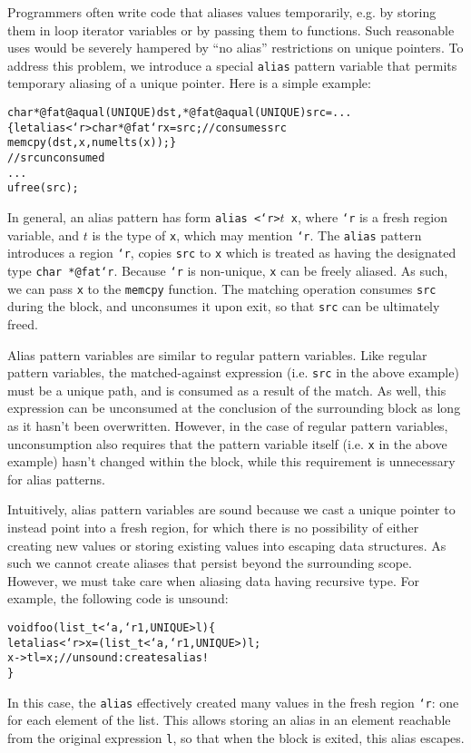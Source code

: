 Programmers often write code that aliases values temporarily, e.g. by
storing them in loop iterator variables or by passing them to functions.
Such reasonable uses would be severely hampered by ``no alias'' restrictions
on unique pointers.  To address this problem, we introduce a special
\texttt{alias} pattern variable that permits temporary aliasing of a unique
pointer.  Here is a simple example:
\begin{alltt}
  char *@fat@aqual(UNIQUE) dst, *@fat@aqual(UNIQUE) src = ...
  \{ let alias <`r>char *@fat`r x = src; // consumes src
    memcpy(dst,x,numelts(x)); \}
  // src unconsumed
  ...
  ufree(src);
\end{alltt}
In general, an alias pattern has form \texttt{alias <`r>$t$ x}, where
\texttt{`r} is a fresh region variable, and $t$ is the type of \texttt{x},
which may mention \texttt{`r}.  The \texttt{alias} pattern introduces a
region \texttt{`r}, copies \texttt{src} to \texttt{x} which is treated as
having the designated type \texttt{char *@fat`r}.  Because \texttt{`r} is
non-unique, \texttt{x} can be freely aliased.  As such, we can pass
\texttt{x} to the \texttt{memcpy} function.  The matching operation consumes
\texttt{src} during the block, and unconsumes it upon exit, so that
\texttt{src} can be ultimately freed.

Alias pattern variables are similar to regular pattern variables.  Like
regular pattern variables, the matched-against expression (i.e. \texttt{src}
in the above example) must be a unique path, and is consumed as a result of
the match.  As well, this expression can be unconsumed at the conclusion of
the surrounding block as long as it hasn't been overwritten.  However, in
the case of regular pattern variables, unconsumption also requires that the
pattern variable itself (i.e. \texttt{x} in the above example) hasn't
changed within the block, while this requirement is unnecessary for alias
patterns.

Intuitively, alias pattern variables are sound because we cast a unique
pointer to instead point into a fresh region, for which there is no
possibility of either creating new values or storing existing values into
escaping data structures.  As such we cannot create aliases that persist
beyond the surrounding scope.  However, we must take care when aliasing data
having recursive type.  For example, the following code is unsound:
\begin{alltt}
  void foo(list\_t<`a, `r1, UNIQUE> l) \{
    let alias <`r> x = (list\_t<`a, `r1, UNIQUE>)l;
    x->tl = x; // unsound: creates alias!
  \}
\end{alltt}
In this case, the \texttt{alias} effectively created many values in the
fresh region \texttt{`r}: one for each element of the list.  This allows
storing an alias in an element reachable from the original expression
\texttt{l}, so that when the block is exited, this alias escapes.


